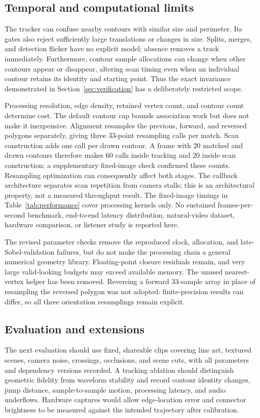 \documentclass[11pt,a4paper]{article}
\begin{document}
\subsection{Temporal and computational limits}\label{sec:temporal-limits}
The tracker can confuse nearby contours with similar size and perimeter. Its gates also reject sufficiently large translations or changes in size. Splits, merges, and detection flicker have no explicit model; absence removes a track immediately. Furthermore, contour sample allocations can change when other contours appear or disappear, altering scan timing even when an individual contour retains its identity and starting point. Thus the exact invariance demonstrated in Section~\ref{sec:verification} has a deliberately restricted scope.

Processing resolution, edge density, retained vertex count, and contour count determine cost. The default contour cap bounds association work but does not make it inexpensive. Alignment resamples the previous, forward, and reversed polygons separately, giving three 33-point resampling calls per match. Scan construction adds one call per drawn contour. A frame with 20 matched and drawn contours therefore makes 60 calls inside tracking and 20 inside scan construction; a supplementary fixed-image check confirmed these counts. Resampling optimization can consequently affect both stages. The callback architecture separates scan repetition from camera stalls; this is an architectural property, not a measured throughput result. The fixed-image timings in Table~\ref{tab:performance} cover processing kernels only. No sustained frames-per-second benchmark, end-to-end latency distribution, natural-video dataset, hardware comparison, or listener study is reported here.

The revised parameter checks remove the reproduced clock, allocation, and late-Sobel-validation failures, but do not make the processing chain a general numerical geometry library. Floating-point closure residuals remain, and very large valid-looking budgets may exceed available memory. The unused nearest-vertex helper has been removed. Reversing a forward 33-sample array in place of resampling the reversed polygon was not adopted: finite-precision results can differ, so all three orientation resamplings remain explicit.

\subsection{Evaluation and extensions}
The next evaluation should use fixed, shareable clips covering line art, textured scenes, camera noise, crossings, occlusions, and scene cuts, with all parameters and dependency versions recorded. A tracking ablation should distinguish geometric fidelity from waveform stability and record contour identity changes, jump distance, sample-to-sample motion, processing latency, and audio underflows. Hardware captures would allow edge-location error and connector brightness to be measured against the intended trajectory after calibration.
\end{document}

